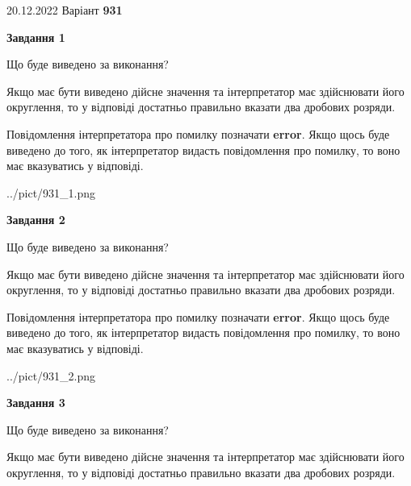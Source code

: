\documentclass[12pt, ukrainian]{article}
\begin{document}
{20.12.2022 Варіант \No \textbf { 931 }\par}
{
\begin {Large}

{\begin {center}\textbf{Завдання 1}\end {center}}\par
Що буде виведено за виконання? \par

Якщо має бути виведено дійсне значення та інтерпретатор має здійснювати його округлення, 
то у відповіді достатньо правильно вказати два дробових розряди.

Повідомлення інтерпретатора про помилку позначати \textbf{error}.
Якщо щось буде виведено до того, як інтерпретатор видасть повідомлення про помилку, 
то воно має вказуватись у відповіді. \par

\begin{center}
	{../pict/931_1.png}
\end{center}
\newpage

{\begin {center}\textbf{Завдання 2}\end {center}}\par
Що буде виведено за виконання? \par

Якщо має бути виведено дійсне значення та інтерпретатор має здійснювати його округлення, 
то у відповіді достатньо правильно вказати два дробових розряди.

Повідомлення інтерпретатора про помилку позначати \textbf{error}.
Якщо щось буде виведено до того, як інтерпретатор видасть повідомлення про помилку, 
то воно має вказуватись у відповіді. \par

\begin{center}
	{../pict/931_2.png}
\end{center}
\newpage

{\begin {center}\textbf{Завдання 3}\end {center}}\par
Що буде виведено за виконання? \par

Якщо має бути виведено дійсне значення та інтерпретатор має здійснювати його округлення, 
то у відповіді достатньо правильно вказати два дробових розряди.


\end{Large}}
\end{document}
